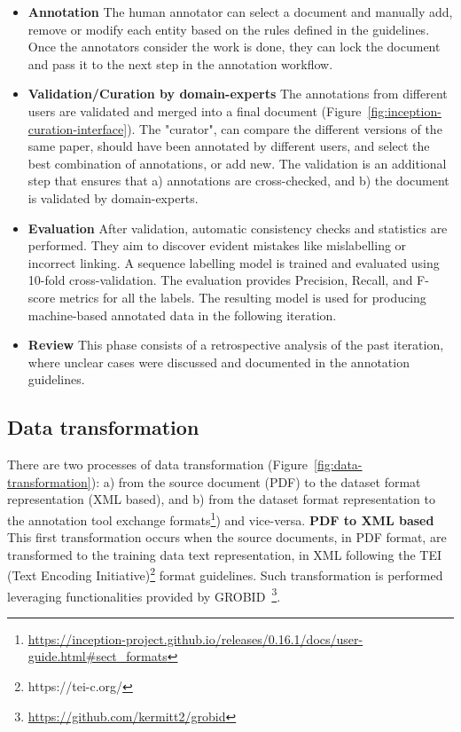 \documentclass[fleqn,10pt]{wlscirep}
\begin{document}
\begin{itemize}
\item \textbf{Annotation} The human annotator can select a document and manually add, remove or modify each entity based on the rules defined in the guidelines. Once the annotators consider the work is done, they can lock the document and pass it to the next step in the annotation workflow. 

\item \textbf{Validation/Curation by domain-experts} The annotations from different users are validated and merged into a final document (Figure~\ref{fig:inception-curation-interface}). 
The "curator", can compare the different versions of the same paper, should have been annotated by different users, and select the best combination of annotations, or add new. 
The validation is an additional step that ensures that a) annotations are cross-checked, and b) the document is validated by domain-experts.

\item \textbf{Evaluation} After validation, automatic consistency checks and statistics are performed. They aim to discover evident mistakes like mislabelling or incorrect linking. 
A sequence labelling model is trained and evaluated using 10-fold cross-validation. The evaluation provides Precision, Recall, and F-score metrics for all the labels.
The resulting model is used for producing machine-based annotated data in the following iteration.

\item \textbf{Review} This phase consists of a retrospective analysis of the past iteration, where unclear cases were discussed and documented in the annotation guidelines. 

\end{itemize}

\subsection*{Data transformation}
\label{subsec:transformation-of-data}
There are two processes of data transformation (Figure~\ref{fig:data-transformation}): a) from the source document (PDF) to the dataset format representation (XML based), and b) from the dataset format representation to the annotation tool exchange formats\footnote{\url{https://inception-project.github.io/releases/0.16.1/docs/user-guide.html\#sect_formats}}) and vice-versa. 
\textbf{PDF to XML based}
This first transformation occurs when the source documents, in PDF format, are transformed to the training data text representation, in XML following the TEI (Text Encoding Initiative)\footnote{https://tei-c.org/} format guidelines.  
Such transformation is performed leveraging functionalities provided by GROBID~\footnote{\url{https://github.com/kermitt2/grobid}}.
\end{document}
